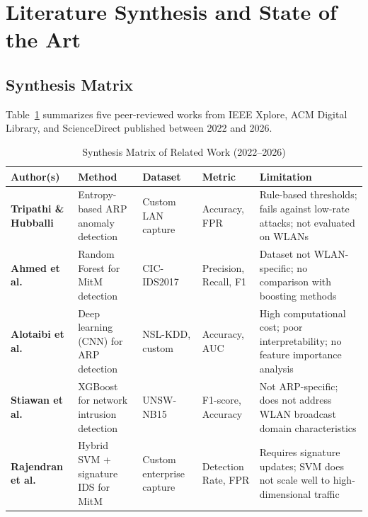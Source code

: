\documentclass[12pt,a4paper]{article}
\begin{document}
\section{Literature Synthesis and State of the Art}

\subsection{Synthesis Matrix}

Table~\ref{tab:synthesis} summarizes five peer-reviewed works from IEEE Xplore,
ACM Digital Library, and ScienceDirect published between 2022 and 2026.

\begin{table}[ht]
\centering
\caption{Synthesis Matrix of Related Work (2022--2026)}
\label{tab:synthesis}
\small
\renewcommand{\arraystretch}{1.4}
\begin{tabularx}{\textwidth}{>{\bfseries}p{2.2cm} p{2.6cm} p{2.0cm} p{2.2cm} p{3.1cm}}
\toprule
\textbf{Author(s)} & \textbf{Method} & \textbf{Dataset} & \textbf{Metric} & \textbf{Limitation} \\
\midrule
Tripathi \& Hubballi \cite{tripathi2022} &
Entropy-based ARP anomaly detection &
Custom LAN capture &
Accuracy, FPR &
Rule-based thresholds; fails against low-rate attacks; not evaluated on WLANs \\

Ahmed et al.\ \cite{ahmed2023} &
Random Forest for MitM detection &
CIC-IDS2017 &
Precision, Recall, F1 &
Dataset not WLAN-specific; no comparison with boosting methods \\

Alotaibi et al.\ \cite{alotaibi2023} &
Deep learning (CNN) for ARP detection &
NSL-KDD, custom &
Accuracy, AUC &
High computational cost; poor interpretability; no feature importance analysis \\

Stiawan et al.\ \cite{stiawan2024} &
XGBoost for network intrusion detection &
UNSW-NB15 &
F1-score, Accuracy &
Not ARP-specific; does not address WLAN broadcast domain characteristics \\

Rajendran et al.\ \cite{rajendran2022} &
Hybrid SVM + signature IDS for MitM &
Custom enterprise capture &
Detection Rate, FPR &
Requires signature updates; SVM does not scale well to high-dimensional traffic \\
\bottomrule
\end{tabularx}
\end{table}
\end{document}
